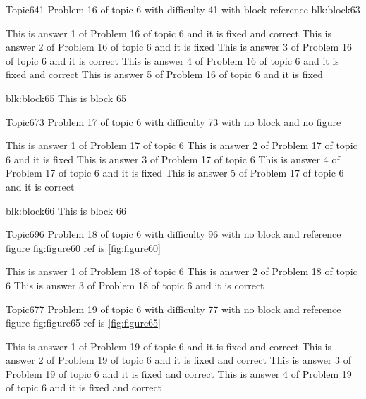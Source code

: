 \documentclass[master]{exam}
\begin{document}
\begin{problem}[requires=blk:block63]{Topic6}{41}
	Problem 16 of topic 6 with difficulty 41 with block reference blk:block63
	\begin{answers}
		 This is answer 1 of Problem 16 of topic 6 and it is fixed and correct
		\answer[fixed] This is answer 2 of Problem 16 of topic 6 and it is fixed
		\answer[correct] This is answer 3 of Problem 16 of topic 6 and it is correct
		 This is answer 4 of Problem 16 of topic 6 and it is fixed and correct
		\answer[fixed] This is answer 5 of Problem 16 of topic 6 and it is fixed
	\end{answers}
\end{problem}



\begin{block}{blk:block65}
This is block 65
\end{block}


\begin{problem}{Topic6}{73}
	Problem 17 of topic 6 with difficulty 73 with no block and no figure
	\begin{answers}
		\answer This is answer 1 of Problem 17 of topic 6 
		\answer[fixed] This is answer 2 of Problem 17 of topic 6 and it is fixed
		\answer This is answer 3 of Problem 17 of topic 6 
		\answer[fixed] This is answer 4 of Problem 17 of topic 6 and it is fixed
		\answer[correct] This is answer 5 of Problem 17 of topic 6 and it is correct
	\end{answers}
\end{problem}



\begin{block}{blk:block66}
This is block 66
\end{block}


\begin{problem}{Topic6}{96}
	Problem 18 of topic 6 with difficulty 96 with no block and reference figure fig:figure60 ref is \ref{fig:figure60}
	\begin{answers}
		\answer This is answer 1 of Problem 18 of topic 6 
		\answer This is answer 2 of Problem 18 of topic 6 
		\answer[correct] This is answer 3 of Problem 18 of topic 6 and it is correct
	\end{answers}
\end{problem}

\begin{problem}{Topic6}{77}
	Problem 19 of topic 6 with difficulty 77 with no block and reference figure fig:figure65 ref is \ref{fig:figure65}
	\begin{answers}
		 This is answer 1 of Problem 19 of topic 6 and it is fixed and correct
		 This is answer 2 of Problem 19 of topic 6 and it is fixed and correct
		 This is answer 3 of Problem 19 of topic 6 and it is fixed and correct
		 This is answer 4 of Problem 19 of topic 6 and it is fixed and correct
	\end{answers}
\end{problem}
\end{document}
